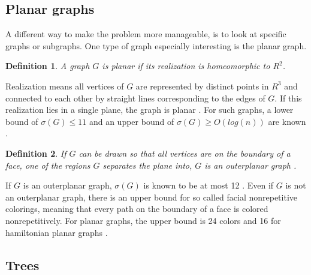 \documentclass[12pt,a4paper]{article}
\newtheorem{definition}{Definition}
\begin{document}
\subsection{Planar graphs}

A different way to make the problem more manageable, is to look at specific graphs or subgraphs. One type of graph especially interesting is the planar graph. 
\begin{definition}
A graph $G$ is planar if its realization is homeomorphic to $R^2$. 
\end{definition}
Realization means all vertices of $G$ are represented by distinct points in $R^3$ and connected to each other by straight lines corresponding to the edges of $G$. If this realization lies in a single plane, the graph is planar \citep[p. 21]{Bollobas1998}. For such graphs, a lower bound of $\sigma(G) \leq 11$ and an upper bound of $\sigma(G) \geq O(log(n))$ are known \citep{Dujmovic2012}. 
\begin{definition}
If $G$ can be drawn so that all vertices are on the boundary of a face, one of the regions $G$ separates the plane into, $G$ is an outerplanar graph \citep[p. 36]{Bollobas1998}.
\end{definition}
If $G$ is an outerplanar graph,  $\sigma(G)$ is known to be at most 12 \citep{Barat2007}. Even if $G$ is not an outerplanar graph, there is an upper bound for so called facial nonrepetitive colorings, meaning that every path on the boundary of a face is colored nonrepetitively. For planar graphs, the upper bound is 24 colors \citep{Barat2013} and 16 for hamiltonian planar graphs \citep{Harant2011}. 

\subsection{Trees}
\end{document}
